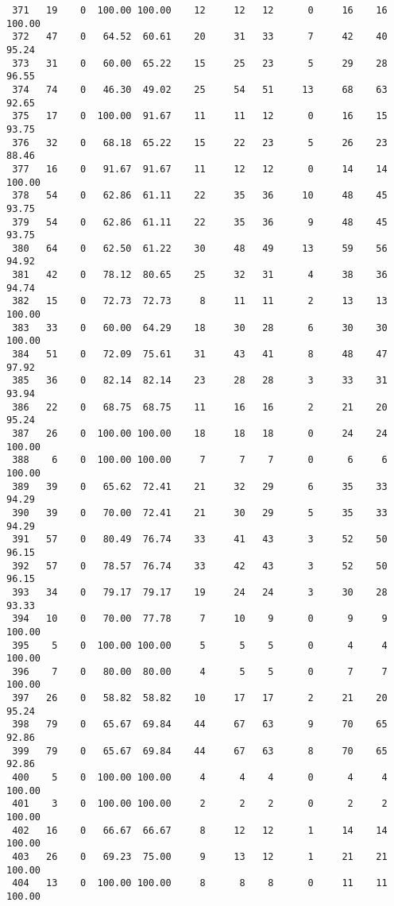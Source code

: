 \begin{verbatim}
 371   19    0  100.00 100.00    12     12   12      0     16    16   100.00
 372   47    0   64.52  60.61    20     31   33      7     42    40    95.24
 373   31    0   60.00  65.22    15     25   23      5     29    28    96.55
 374   74    0   46.30  49.02    25     54   51     13     68    63    92.65
 375   17    0  100.00  91.67    11     11   12      0     16    15    93.75
 376   32    0   68.18  65.22    15     22   23      5     26    23    88.46
 377   16    0   91.67  91.67    11     12   12      0     14    14   100.00
 378   54    0   62.86  61.11    22     35   36     10     48    45    93.75
 379   54    0   62.86  61.11    22     35   36      9     48    45    93.75
 380   64    0   62.50  61.22    30     48   49     13     59    56    94.92
 381   42    0   78.12  80.65    25     32   31      4     38    36    94.74
 382   15    0   72.73  72.73     8     11   11      2     13    13   100.00
 383   33    0   60.00  64.29    18     30   28      6     30    30   100.00
 384   51    0   72.09  75.61    31     43   41      8     48    47    97.92
 385   36    0   82.14  82.14    23     28   28      3     33    31    93.94
 386   22    0   68.75  68.75    11     16   16      2     21    20    95.24
 387   26    0  100.00 100.00    18     18   18      0     24    24   100.00
 388    6    0  100.00 100.00     7      7    7      0      6     6   100.00
 389   39    0   65.62  72.41    21     32   29      6     35    33    94.29
 390   39    0   70.00  72.41    21     30   29      5     35    33    94.29
 391   57    0   80.49  76.74    33     41   43      3     52    50    96.15
 392   57    0   78.57  76.74    33     42   43      3     52    50    96.15
 393   34    0   79.17  79.17    19     24   24      3     30    28    93.33
 394   10    0   70.00  77.78     7     10    9      0      9     9   100.00
 395    5    0  100.00 100.00     5      5    5      0      4     4   100.00
 396    7    0   80.00  80.00     4      5    5      0      7     7   100.00
 397   26    0   58.82  58.82    10     17   17      2     21    20    95.24
 398   79    0   65.67  69.84    44     67   63      9     70    65    92.86
 399   79    0   65.67  69.84    44     67   63      8     70    65    92.86
 400    5    0  100.00 100.00     4      4    4      0      4     4   100.00
 401    3    0  100.00 100.00     2      2    2      0      2     2   100.00
 402   16    0   66.67  66.67     8     12   12      1     14    14   100.00
 403   26    0   69.23  75.00     9     13   12      1     21    21   100.00
 404   13    0  100.00 100.00     8      8    8      0     11    11   100.00

\end{verbatim}
